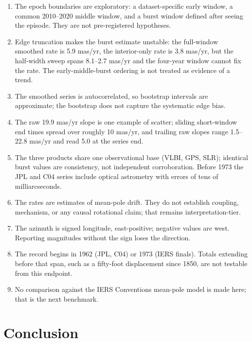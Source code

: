 \documentclass[11pt,a4paper]{article}
\begin{document}
\begin{enumerate}[leftmargin=*]
\item The epoch boundaries are exploratory: a dataset-specific early window, a common 2010--2020 middle window, and a burst window defined after seeing the episode. They are not pre-registered hypotheses.
\item Edge truncation makes the burst estimate unstable: the full-window smoothed rate is 5.9 mas/yr, the interior-only rate is 3.8 mas/yr, but the half-width sweep spans 8.1--2.7 mas/yr and the four-year window cannot fix the rate. The early-middle-burst ordering is not treated as evidence of a trend.
\item The smoothed series is autocorrelated, so bootstrap intervals are approximate; the bootstrap does not capture the systematic edge bias.
\item The raw 19.9 mas/yr slope is one example of scatter; sliding short-window end times spread over roughly 10 mas/yr, and trailing raw slopes range 1.5--22.8 mas/yr and read 5.0 at the series end.
\item The three products share one observational base (VLBI, GPS, SLR); identical burst values are consistency, not independent corroboration. Before 1973 the JPL and C04 series include optical astrometry with errors of tens of milliarcseconds.
\item The rates are estimates of mean-pole drift. They do not establish coupling, mechanism, or any causal rotational claim; that remains interpretation-tier.
\item The azimuth is signed longitude, east-positive; negative values are west. Reporting magnitudes without the sign loses the direction.
\item The record begins in 1962 (JPL, C04) or 1973 (IERS finals). Totals extending before that span, such as a fifty-foot displacement since 1850, are not testable from this endpoint.
\item No comparison against the IERS Conventions mean-pole model is made here; that is the next benchmark.
\end{enumerate}

\section{Conclusion}
\end{document}
